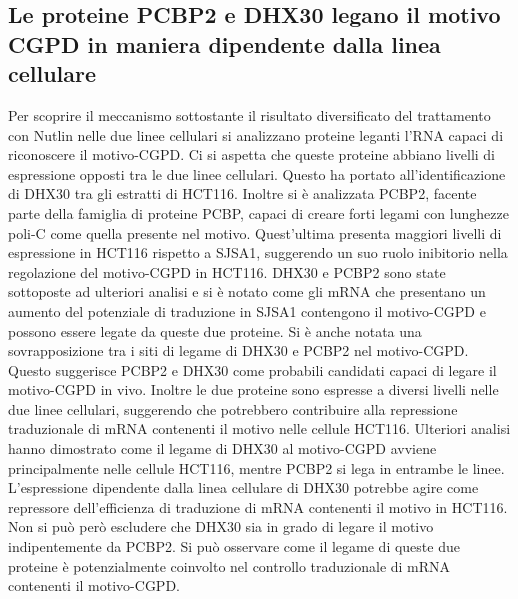   \subsection{Le proteine PCBP2 e DHX30 legano il motivo CGPD in maniera dipendente dalla linea cellulare}
  Per scoprire il meccanismo sottostante il risultato diversificato del trattamento con Nutlin nelle due linee cellulari si analizzano proteine leganti l'RNA capaci di riconoscere il motivo-CGPD.
  Ci si aspetta che queste proteine abbiano livelli di espressione opposti tra le due linee cellulari.
  Questo ha portato all'identificazione di DHX30 tra gli estratti di HCT116.
  Inoltre si \`e analizzata PCBP2, facente parte della famiglia di proteine PCBP, capaci di creare forti legami con lunghezze poli-C come quella presente nel motivo.
  Quest'ultima presenta maggiori livelli di espressione in HCT116 rispetto a SJSA1, suggerendo un suo ruolo inibitorio nella regolazione del motivo-CGPD in HCT116.
  DHX30 e PCBP2 sono state sottoposte ad ulteriori analisi e si \`e notato come gli mRNA che presentano un aumento del potenziale di traduzione in SJSA1 contengono il motivo-CGPD e possono essere legate da queste due proteine.
  Si \`e anche notata una sovrapposizione tra i siti di legame di DHX30 e PCBP2 nel motivo-CGPD.
  Questo suggerisce PCBP2 e DHX30 come probabili candidati capaci di legare il motivo-CGPD in vivo.
  Inoltre le due proteine sono espresse a diversi livelli nelle due linee cellulari, suggerendo che potrebbero contribuire alla repressione traduzionale di mRNA contenenti il motivo nelle cellule HCT116.
  Ulteriori analisi hanno dimostrato come il legame di DHX30 al motivo-CGPD avviene principalmente nelle cellule HCT116, mentre PCBP2 si lega in entrambe le linee.
  L'espressione dipendente dalla linea cellulare di DHX30 potrebbe agire come repressore dell'efficienza di traduzione di mRNA contenenti il motivo in HCT116.
  Non si pu\`o per\`o escludere che DHX30 sia in grado di legare il motivo indipentemente da PCBP2.
  Si pu\`o osservare come il legame di queste due proteine \`e potenzialmente coinvolto nel controllo traduzionale di mRNA contenenti il motivo-CGPD.

